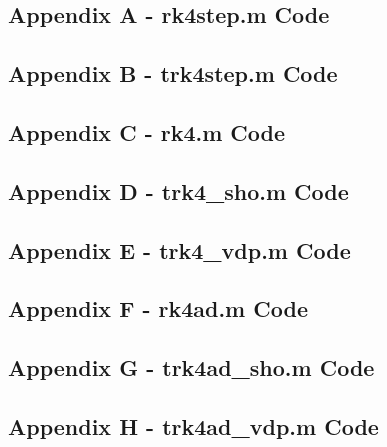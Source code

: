 \documentclass[10pt]{article}
\begin{document}
\pagebreak


\subsection*{Appendix A - rk4step.m Code}

\pagebreak

\subsection*{Appendix B - trk4step.m Code}

\pagebreak

\subsection*{Appendix C - rk4.m Code}

\pagebreak

\subsection*{Appendix D - trk4\_sho.m Code}

\pagebreak

\subsection*{Appendix E - trk4\_vdp.m Code}

\pagebreak

\subsection*{Appendix F - rk4ad.m Code}

\pagebreak

\subsection*{Appendix G - trk4ad\_sho.m Code}

\pagebreak

\subsection*{Appendix H - trk4ad\_vdp.m Code}

\pagebreak
\end{document}
